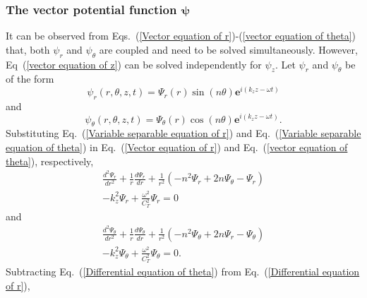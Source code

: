 \documentclass[10pt]{asme2ej}
\begin{document}
\subsubsection{The  vector potential function $\pmb{\psi}$}
It can be observed from Eqs.~(\ref{Vector equation of r})-(\ref{vector equation of theta}) that, both $\psi_r$ and $\psi_\theta$ are coupled and need to be solved simultaneously. However, Eq~(\ref{vector equation of z}) can be solved independently for $\psi_z$. Let $\psi_r$ and $\psi_\theta$ be of the form
\begin{equation}\label{Variable separable equation of r}
    \psi_{r}(r,\theta,z,t) = \Psi_{r}(r)\sin(n\theta)\mathbf{e}^{i(k_{z}z-\omega t)}
\end{equation}
and
\begin{equation}\label{Variable separable equation of theta}
    \psi_{\theta}(r,\theta,z,t) = \Psi_{\theta}(r)\cos(n\theta)\mathbf{e}^{i(k_{z}z-\omega t)}.
\end{equation}
Substituting Eq.~(\ref{Variable separable equation of r}) and Eq.~(\ref{Variable separable equation of theta}) in Eq.~(\ref{Vector equation of r}) and Eq.~(\ref{vector equation of theta}), respectively,
\begin{multline}\label{Differential equation of r}
    \frac{d^{2}\Psi_{r}}{dr^{2}} + \frac{1}{r}\frac{d\Psi_{r}}{dr} + \frac{1}{r^{2}}\left(-n^{2}\Psi_{r}+2n\Psi_{\theta}-\Psi_{r}\right)\\ - k_{z}^{2}\Psi_{r} + \frac{\omega^{2}}{C_{T}^{2}}\Psi_{r} = 0
\end{multline}
and 
\begin{multline}\label{Differential equation of theta}
    \frac{d^{2}\Psi_{\theta}}{dr^{2}} + \frac{1}{r}\frac{d\Psi_{\theta}}{dr} + \frac{1}{r^{2}}\left(-n^{2}\Psi_{\theta}+2n\Psi_{r}-\Psi_{\theta}\right)\\ - k_{z}^{2}\Psi_{\theta} + \frac{\omega^{2}}{C_{T}^{2}}\Psi_{\theta} = 0.
\end{multline}
Subtracting Eq.~(\ref{Differential equation of theta}) from Eq.~(\ref{Differential equation of r}),
\end{document}
